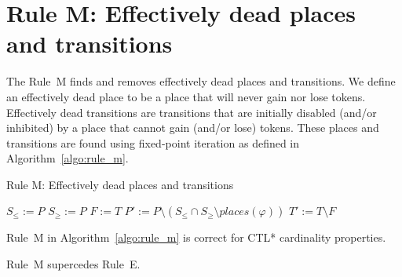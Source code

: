 \section*{Rule M: Effectively dead places and transitions}\label{sec:rule_m}
The Rule~M finds and removes effectively dead places and transitions.
We define an effectively dead place to be a place that will never gain nor lose tokens.
Effectively dead transitions are transitions that are initially disabled (and/or inhibited)
by a place that cannot gain (and/or lose) tokens.
These places and transitions are found using fixed-point iteration as defined in Algorithm~\ref{algo:rule_m}.

\begin{algorithm}
    \vspace{0.2cm}
    \caption{Rule M: Effectively dead places and transitions}
    \label{algo:rule_m}
    \DontPrintSemicolon
    \LinesNumbered
    \vspace{1mm}
    $S_\leq:=P$
    $S_\geq:=P$
    $F:=T$
    $P':=P\setminus(S_\leq\cap S_\geq\setminus places(\varphi))$\;
    $T':=T\setminus F$\;
    \vspace{0.2cm}
\end{algorithm}

\begin{theorem}\label{theorem:rule_m}
    Rule~M in Algorithm~\ref{algo:rule_m} is correct for CTL* cardinality properties.
\end{theorem}
\begin{theorem}\label{theorem:rule_m_supercedes_e}
Rule~M supercedes Rule~E.
\end{theorem}

